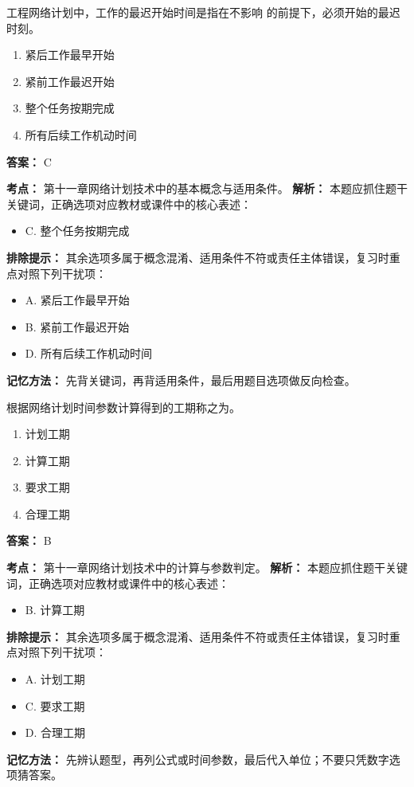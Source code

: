 \documentclass[UTF8,fontset=fandol,11pt]{ctexart}
\begin{document}
\begin{quizbox}[title={第 2 题}]
工程网络计划中，工作的最迟开始时间是指在不影响 的前提下，必须开始的最迟时刻。\\
\begin{enumerate}[label=\Alph*.]
\item 紧后工作最早开始
\item 紧前工作最迟开始
\item 整个任务按期完成
\item 所有后续工作机动时间
\end{enumerate}
\textbf{答案：} C
\vspace{0.25em}
\begin{answerbox}[title={考点解析}]
\textbf{考点：} 第十一章网络计划技术中的基本概念与适用条件。
\textbf{解析：} 本题应抓住题干关键词，正确选项对应教材或课件中的核心表述：
\begin{itemize}
\item C. 整个任务按期完成
\end{itemize}
\textbf{排除提示：} 其余选项多属于概念混淆、适用条件不符或责任主体错误，复习时重点对照下列干扰项：
\begin{itemize}
\item A. 紧后工作最早开始
\item B. 紧前工作最迟开始
\item D. 所有后续工作机动时间
\end{itemize}
\textbf{记忆方法：} 先背关键词，再背适用条件，最后用题目选项做反向检查。
\end{answerbox}
\end{quizbox}

\vspace{0.2em}

\begin{quizbox}[title={第 3 题}]
根据网络计划时间参数计算得到的工期称之为。\\
\begin{enumerate}[label=\Alph*.]
\item 计划工期
\item 计算工期
\item 要求工期
\item 合理工期
\end{enumerate}
\textbf{答案：} B
\vspace{0.25em}
\begin{answerbox}[title={考点解析}]
\textbf{考点：} 第十一章网络计划技术中的计算与参数判定。
\textbf{解析：} 本题应抓住题干关键词，正确选项对应教材或课件中的核心表述：
\begin{itemize}
\item B. 计算工期
\end{itemize}
\textbf{排除提示：} 其余选项多属于概念混淆、适用条件不符或责任主体错误，复习时重点对照下列干扰项：
\begin{itemize}
\item A. 计划工期
\item C. 要求工期
\item D. 合理工期
\end{itemize}
\textbf{记忆方法：} 先辨认题型，再列公式或时间参数，最后代入单位；不要只凭数字选项猜答案。
\end{answerbox}
\end{quizbox}
\end{document}
